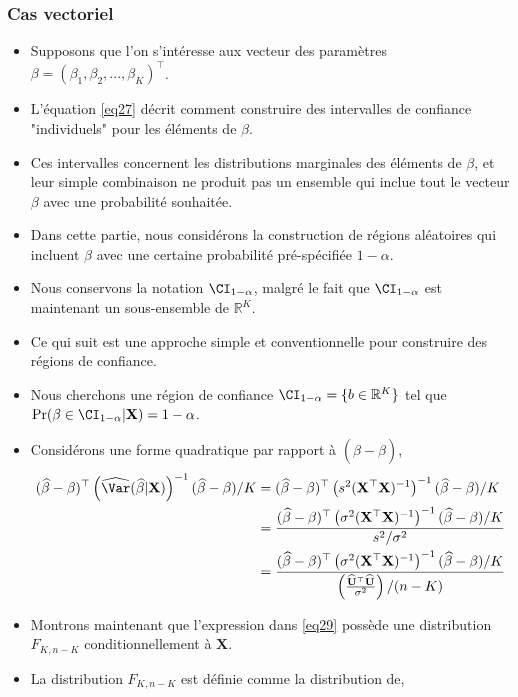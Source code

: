 \begin{frame}[allowframebreaks]\frametitle{Cas vectoriel}
\begin{itemize}
\item Supposons que l'on s'intéresse aux vecteur des paramètres $\beta =(\beta_1,\beta_2,...,\beta_K)^\top$. \item L'équation \eqref{eq27} décrit comment construire des intervalles de confiance "individuels" pour les éléments de $\beta$. 
\item Ces intervalles concernent les distributions marginales des éléments de $\beta$, et leur simple combinaison ne produit pas un ensemble qui inclue tout le vecteur $\beta$ avec une probabilité souhaitée. 
\item Dans cette partie, nous considérons la construction de régions aléatoires qui incluent $\beta$ avec une certaine probabilité pré-spécifiée $1-\alpha$. 
\item Nous conservons la notation $\CI_{1-\alpha}$, malgré le fait que  $\CI_{1-\alpha}$ est maintenant un sous-ensemble de $\mathbb{R}^K$.
\item Ce qui suit est une approche simple et conventionnelle pour construire des régions de confiance. 
\item Nous cherchons une région de confiance $\CI_{1-\alpha} = \{b \in \mathbb{R}^K\}$ tel que $\Pr(\beta \in \CI_{1-\alpha} | \mathbf{X})=1-\alpha$. 
\item Considérons une forme quadratique par rapport à $(\widehat{\beta}-\beta)$,
\begin{align}
(\widehat{\beta}-\beta)^\top\left(\widehat{\Var}(\widehat{\beta}|\mathbf{X})\right)^{-1}(\widehat{\beta}-\beta)/K &=
(\widehat{\beta}-\beta)^\top\left(s^2(\mathbf{X}^\top\mathbf{X})^{-1}
\right)^{-1}
(\widehat{\beta}-\beta)/K \nonumber\\
&=\frac{
(\widehat{\beta}-\beta)^\top\left(\sigma^2(\mathbf{X}^\top\mathbf{X})^{-1}
\right)^{-1}
(\widehat{\beta}-\beta)/K}
{s^2/\sigma^2}\nonumber\\
&=\frac{
(\widehat{\beta}-\beta)^\top\left(\sigma^2(\mathbf{X}^\top\mathbf{X})^{-1}
\right)^{-1}
(\widehat{\beta}-\beta)/K}
{\left(\frac{\widehat{\mathbf{U}}^\top\widehat{\mathbf{U}}}{\sigma^2}\right)/(n-K)}
\label{eq29}
\end{align}
\item Montrons maintenant que l'expression dans \eqref{eq29} possède une distribution $F_{K,n-K}$ conditionnellement à $\mathbf{X}$.
\item La distribution $F_{K,n-K}$ est définie comme la distribution de,

\end{itemize}
\end{frame}
